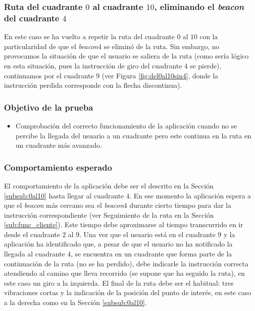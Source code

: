 \subsubsection{Ruta del cuadrante $0$ al cuadrante $10$, eliminando el \textit{beacon} del cuadrante $4$}
\label{subsub:0al10sin4}

En este caso se ha vuelto a repetir la ruta del cuadrante $0$ al $10$ con la particularidad de que el \textit{beacon$4$} se eliminó de la ruta. Sin embargo, no provocamos la situación de que el usuario se saliera de la ruta (como sería lógico en esta situación, pues la instrucción de giro del cuadrante $4$ se pierde), continuamos por el cuadrante $9$ (ver Figura \ref{fig:del0al10sin4}, donde la instrucción perdida corresponde con la flecha discontinua). 

\subsubsection*{Objetivo de la prueba}

\begin{itemize}
	\item Comprobación del correcto funcionamiento de la aplicación cuando no se percibe la llegada del usuario a un cuadrante pero este continua en la ruta en un cuadrante más avanzado.
\end{itemize}


\subsubsection*{Comportamiento esperado}

El comportamiento de la aplicación debe ser el descrito en la Sección \ref{subsub:0al10} hasta llegar al cuadrante $4$. En ese momento la aplicación espera a que el \textit{beacon} más cercano sea el \textit{beacon$4$} durante cierto tiempo para dar la instrucción correspondiente (ver Seguimiento de la ruta en la Sección \ref{sub:func_cliente}). Este tiempo debe aproximarse al tiempo transcurrido en ir desde el cuadrante $2$ al $9$. Una vez que el usuario está en el cuadrante $9$ y la aplicación ha identificado que, a pesar de que el usuario no ha notificado la llegada al cuadrante $4$, se encuentra en un cuadrante que forma parte de la continuación de la ruta (no se ha perdido), debe indicarle la instrucción correcta atendiendo al camino que lleva recorrido (se supone que ha seguido la ruta), en este caso un giro a la izquierda. El final de la ruta debe ser el habitual: tres vibraciones cortas y la indicación de la posición del punto de interés, en este caso a la derecha como en la Sección \ref{subsub:0al10}.


